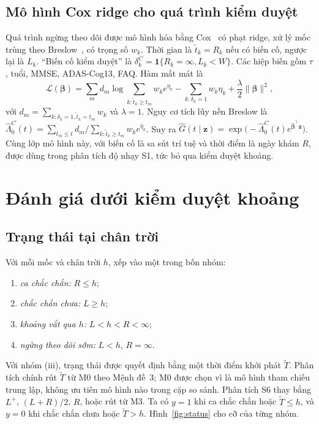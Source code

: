 \documentclass[journal]{IEEEtran}
\begin{document}
\subsection{Mô hình Cox ridge cho quá trình kiểm duyệt}
Quá trình ngừng theo dõi được mô hình hóa bằng Cox~\cite{cox1972} có phạt ridge, xử lý mốc trùng theo Breslow~\cite{breslow1974}, có trọng số $w_k$. Thời gian là $\tilde t_k=R_k$ nếu có biến cố, ngược lại là $L_k$. ``Biến cố kiểm duyệt'' là $\delta_k^C=\bm 1\{R_k=\infty, L_k<W\}$. Các hiệp biến gồm $\tau$, tuổi, MMSE, ADAS-Cog13, FAQ. Hàm mất mát là
\begin{equation}\label{eq:cox}
\mathcal L(\bm\beta)=\sum_m d_m\log\!\!\sum_{k:\tilde t_k\ge t_m}\!\! w_ke^{\eta_k}-\sum_{k:\delta_k=1}w_k\eta_k+\frac{\lambda}{2}\|\bm\beta\|^2,
\end{equation}
với $d_m=\sum_{k:\delta_k=1,\tilde t_k=t_m}w_k$ và $\lambda=1$. Nguy cơ tích lũy nền Breslow là $\hat\Lambda_0^C(t)=\sum_{t_m\le t}d_m/\sum_{k:\tilde t_k\ge t_m}w_ke^{\hat\eta_k}$. Suy ra $\hat G(t\mid\bm z)=\exp\bigl(-\hat\Lambda_0^C(t)e^{\hat{\bm\beta}^\top\bm z}\bigr)$. Cùng lớp mô hình này, với biến cố là sa sút trí tuệ và thời điểm là ngày khám $R$, được dùng trong phân tích độ nhạy S1, tức bỏ qua kiểm duyệt khoảng.

\section{Đánh giá dưới kiểm duyệt khoảng}\label{sec:eval}
\subsection{Trạng thái tại chân trời}\label{sec:status}
Với mỗi mốc và chân trời $h$, xếp vào một trong bốn nhóm:
\begin{enumerate}
\item \emph{ca chắc chắn:} $R\le h$;
\item \emph{chắc chắn chưa:} $L\ge h$;
\item \emph{khoảng vắt qua $h$:} $L<h<R<\infty$;
\item \emph{ngừng theo dõi sớm:} $L<h$, $R=\infty$.
\end{enumerate}
Với nhóm (iii), trạng thái được quyết định bằng một thời điểm khởi phát $\tilde T$. Phân tích chính rút $\tilde T$ từ M0 theo Mệnh đề~3; M0 được chọn vì là mô hình tham chiếu trung lập, không ưu tiên mô hình nào trong cặp so sánh. Phân tích S6 thay bằng $L^+$, $(L+R)/2$, $R$, hoặc rút từ M3. Ta có $y=1$ khi ca chắc chắn hoặc $\tilde T\le h$, và $y=0$ khi chắc chắn chưa hoặc $\tilde T>h$. Hình~\ref{fig:status} cho cỡ của từng nhóm.
\end{document}
